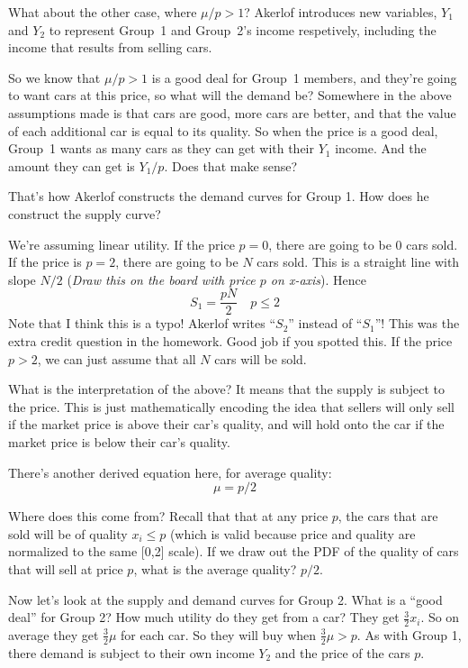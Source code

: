 \documentclass[11pt]{article}
\begin{document}
What about the other case, where $\mu/p > 1$? Akerlof introduces new variables, $Y_1$ and $Y_2$ to represent Group~1 and Group~2's income respetively, including the income that results from selling cars. 

So we know that $\mu/p > 1$ is a good deal for Group~1 members, and they're going to want cars at this price, so what will the demand be? Somewhere in the above assumptions made is that cars are good, more cars are better, and that the value of each additional car is equal to its quality. So when the price is a good deal, Group~1 wants as many cars as they can get with their $Y_1$ income. And the amount they can get is $Y_1/p$. Does that make sense?

That's how Akerlof constructs the demand curves for Group 1. How does he construct the supply curve? 

We're assuming linear utility. If the price $p=0$, there are going to be 0 cars sold. If the price is $p=2$, there are going to be $N$ cars sold. This is a straight line with slope $N/2$ ({\it Draw this on the board with price $p$ on x-axis}). Hence 
\begin{equation}
    S_1 = \frac{pN}{2} \quad p \leq 2
\end{equation}
Note that I think this is a typo! Akerlof writes ``$S_2$'' instead of ``$S_1$''! This was the extra credit question in the homework. Good job if you spotted this. If the price $p>2$, we can just assume that all $N$ cars will be sold. 

What is the interpretation of the above? It means that the supply is subject to the price. This is just mathematically encoding the idea that sellers will only sell if the market price is above their car's quality, and will hold onto the car if the market price is below their car's quality. 

There's another derived equation here, for average quality:
\begin{equation}
    \mu = p/2
\end{equation}

Where does this come from? Recall that that at any price $p$, the cars that are sold will be of quality $x_i \leq p$ (which is valid because price and quality are normalized to the same [0,2] scale). If we draw out the PDF of the quality of cars that will sell at price $p$, what is the average quality? $p/2$.

Now let's look at the supply and demand curves for Group 2. What is a ``good deal'' for Group 2? How much utility do they get from a car? They get $\frac{3}{2}x_i$. So on average they get $\frac{3}{2}\mu$ for each car. So they will buy when $\frac{3}{2}\mu > p$.
As with Group 1, there demand is subject to their own income $Y_2$ and the price of the cars $p$. 
\end{document}

